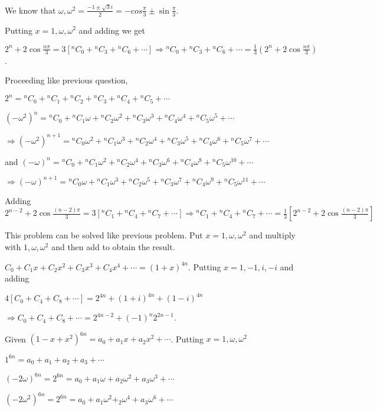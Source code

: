   We know that $\omega, \omega^2 = \frac{-1\pm\sqrt{3}i}{2} = -cos\frac{\pi}{3} \pm \sin\frac{\pi}{3}$.

  Putting $x = 1, \omega, \omega^2$ and adding we get

  $2^n + 2\cos\frac{n\pi}{3} = 3[{}^nC_0 + {}^nC_3 + {}^nC_6 + \cdots] \Rightarrow {}^nC_0 + {}^nC_3 +
  {}^nC_6 + \cdots = \frac{1}{3}\left(2^n + 2\cos\frac{n\pi}{3}\right)$.
\item Proceeding like previous question,

  $2^n = {}^nC_0 + {}^nC_1 + {}^nC_2 + {}^nC_3 + {}^nC_4 + {}^nC_5 + \cdots$

  $(-\omega^2)^n = {}^nC_0 + {}^nC_1\omega + {}^nC_2\omega^2 + {}^nC_3\omega^3 + {}^nC_4\omega^4 +
  {}^nC_5\omega^5 + \cdots$

  $\Rightarrow (-\omega^2)^{n + 1} = {}^nC_0\omega^2 + {}^nC_1\omega^3 + {}^nC_2\omega^4 + {}^nC_3\omega^5 + {}^nC_4\omega^6 +
  {}^nC_5\omega^7 + \cdots$

  and $(-\omega)^n = {}^nC_0 + {}^nC_1\omega^2 + {}^nC_2\omega^4 + {}^nC_3\omega^6 + {}^nC_4\omega^8 +
  {}^nC_5\omega^{10} + \cdots$

  $\Rightarrow (-\omega)^{n + 1} = {}^nC_0\omega + {}^nC_1\omega^3 + {}^nC_2\omega^5 + {}^nC_3\omega^7 + {}^nC_4\omega^9 +
  {}^nC_5\omega^{11} + \cdots$

  Adding $2^{n - 2} + 2\cos\frac{(n- 2)\pi}{3} = 3[{}^nC_1 + {}^nC_4 + {}^nC_7 + \cdots] \Rightarrow {}^nC_1
  + {}^nC_4 + {}^nC_7 + \cdots = \frac{1}{3}\left[2^{n - 2} + 2\cos\frac{(n - 2)\pi}{3}\right]$
\item This problem can be solved like previous problem. Put $x = 1, \omega, \omega^2$ and multiply with $1,
  \omega, \omega^2$ and then add to obtain the result.
\item $C_0 + C_1x + C_2x^2 + C_3x^3 + C_4x^4 + \cdots = (1 + x)^{4n}$. Putting $x = 1, -1, i, -i$ and adding

  $4[C_0 + C_4 + C_8 + \cdots] = 2^{4n} + (1 + i)^{4n} + (1 - i)^{4n}$

  $\Rightarrow C_0 + C_4 + C_8 + \cdots = 2^{4n - 2} + (-1)^n2^{2n - 1}$.
\item Given $(1 - x + x^2)^{6n} = a_0 + a_1x + a_2x^2 + \cdots$. Putting $x = 1, \omega, \omega^2$

  $1^{6n} = a_0 + a_1 + a_2 + a_3 + \cdots$

  $(-2\omega)^{6n}= 2^{6n} = a_0 + a_1\omega + a_2\omega^2 + a_3\omega^3 + \cdots$

  $(-2\omega^2)^{6n}= 2^{6n} = a_0 + a_1\omega^2 + _2\omega^4 + a_3\omega^6 + \cdots$

